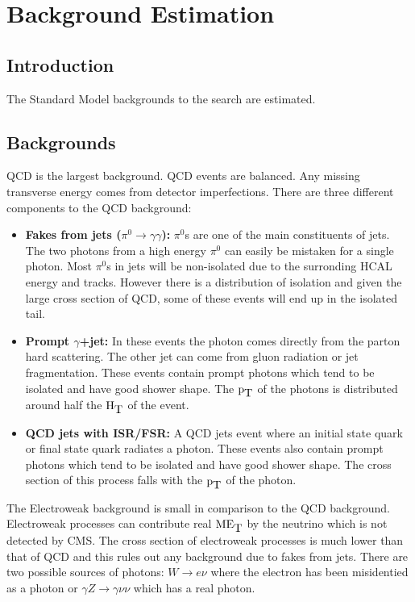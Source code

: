 \chapter{Background Estimation}

\section{Introduction}

The Standard Model backgrounds to the search are estimated.  

\section{Backgrounds}

QCD is the largest background. QCD events are balanced. Any missing transverse
energy comes from detector imperfections. There are three different components 
to the QCD background:

\begin{itemize}
\item {\bf Fakes from jets ($\pi^{0}\rightarrow\gamma\gamma$):} $\pi^{0}$s are
one of the main constituents of jets. The two photons from a high energy 
$\pi^{0}$ can easily be mistaken for a single photon. Most $\pi^{0}$s in jets
will be non-isolated due to the surronding HCAL energy and tracks. However
there is a distribution of isolation and given the large cross section of QCD, 
some of these events will end up in the isolated tail.
\item {\bf Prompt $\gamma$+jet:} In these events the photon comes directly from
the parton hard scattering. The other jet can come from gluon radiation or
jet fragmentation. These events contain prompt photons which tend to be isolated
and have good shower shape. The $\mbox{p}_{\mbox{T}}$ of the photons is distributed around half
the $\mbox{H}_{\mbox{T}}$ of the event.
\item {\bf QCD jets with ISR/FSR:} A QCD jets event where an initial state quark
or final state quark radiates a photon. These events also contain prompt photons
which tend to be isolated and have good shower shape. The cross section of this 
process falls with the $\mbox{p}_{\mbox{T}}$ of the photon. 
\end{itemize}

The Electroweak background is small in comparison to the QCD background.
Electroweak processes can contribute real $\mbox{ME}_{\mbox{T}}$ by the neutrino which is not
detected by CMS. The cross section of electroweak processes is much lower than
that of QCD and this rules out any background due to fakes from jets. There are
two possible sources of photons: $W\rightarrow e\nu$ where the electron has been
misidentied as a photon or $\gamma Z\rightarrow\gamma\nu\nu$ which has a real
photon. \\

